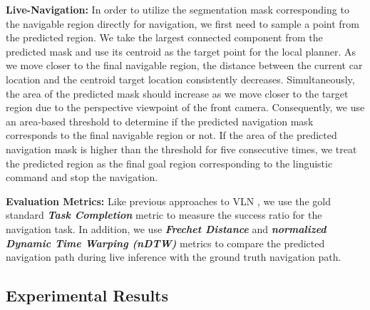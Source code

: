 \documentclass[11pt]{article}
\begin{document}
\textbf{Live-Navigation: }In order to utilize the segmentation mask corresponding to the navigable region directly for navigation, we first need to sample a point from the predicted region. We take the largest connected component from the predicted mask and use its centroid as the target point for the local planner. As we move closer to the final navigable region, the distance between the current car location and the centroid target location consistently decreases. Simultaneously, the area of the predicted mask should increase as we move closer to the target region due to the perspective viewpoint of the front camera. Consequently, we use an area-based threshold to determine if the predicted navigation mask corresponds to the final navigable region or not. If the area of the predicted navigation mask is higher than the threshold for five consecutive times, we treat the predicted region as the final goal region corresponding to the linguistic command and stop the navigation.


\textbf{Evaluation Metrics:} Like previous approaches to VLN \cite{schumann-riezler-2022-analyzing, xiang-etal-2020-learning, chen2019touchdown}, we use the gold standard \textbf{\textit{Task Completion}} metric to measure the success ratio for the navigation task. In addition, we use \textbf{\textit{Frechet Distance}} and \textbf{\textit{normalized Dynamic Time Warping (nDTW)}} metrics to compare the predicted navigation path during live inference with the ground truth navigation path. 

\subsection{Experimental Results}
\end{document}
